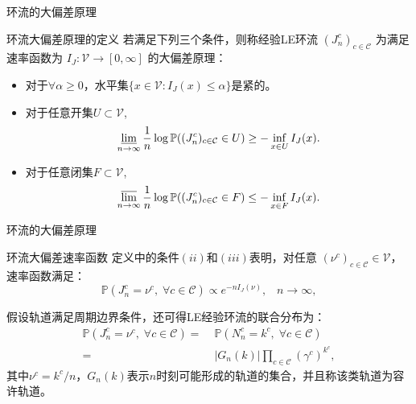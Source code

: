 \documentclass{beamer}
\begin{document}
\begin{frame}{环流的大偏差原理}
	\begin{block}{环流大偏差原理的定义}
		若满足下列三个条件，则称经验LE环流 $(J_n^c)_{c \in \mathcal{C}}$ 为满足速率函数为 $I_J:\mathcal{V}\rightarrow [0,\infty]$ 的大偏差原理：
		\begin{itemize}
			\item 对于$\forall \alpha \geqslant 0$，水平集$\{x \in \mathcal{V}: I_{J}(x) \leqslant \alpha\}$是紧的。
			\item 对于任意开集$U \subset \mathcal{V}$,
			      \begin{equation}\label{def1}
				      \varliminf_{n\to\infty}\frac{1}{n}\log\mathbb{P}((J^c_n)_{c\in\mathcal{C}}\in U)\ge-\inf_{x\in U}I_J(x).
			      \end{equation}
			\item 对于任意闭集$F \subset \mathcal{V}$,
			      \begin{equation}\label{def2}
				      \varlimsup_{n\to \infty}\frac{1}{n}\log\mathbb{P}((J^c_n)_{c\in\mathcal{C}}\in F)\le -\inf_{x\in F}I_J(x).
			      \end{equation}
		\end{itemize}
	\end{block}
\end{frame}

\begin{frame}{环流的大偏差原理}
	\begin{block}{环流大偏差速率函数}
		定义中的条件$(ii)$和$(iii)$表明，对任意 $(\nu^c)_{c\in\mathcal{C}}\in\mathcal{V}$，速率函数满足：
		\begin{equation*}\label{LDP}
			\mathbb{P}(J^c_n=\nu^c,\;\forall c\in\mathcal{C})\propto e^{-n I_J(\nu)},\;\;\;n\to\infty,
		\end{equation*}

		假设轨道满足周期边界条件，还可得LE经验环流的联合分布为：
		\begin{equation*}\label{joint}
			\begin{split}
				\mathbb{P}\left(J^c_n=\nu^c,\;\forall c\in\mathcal{C}\right)
				=&\;\mathbb{P}\left(N^c_n=k^c,\;\forall c\in\mathcal{C}\right)\\
				=&\;|G_n(k)|\prod_{c\in\mathcal{C}}\left(\gamma^c\right)^{k^c},
			\end{split}
		\end{equation*}
		其中$\nu^c = k^c/n$，$G_n(k)$表示$n$时刻可能形成的轨道的集合，并且称该类轨道为容许轨道。
	\end{block}
\end{frame}
\end{document}
